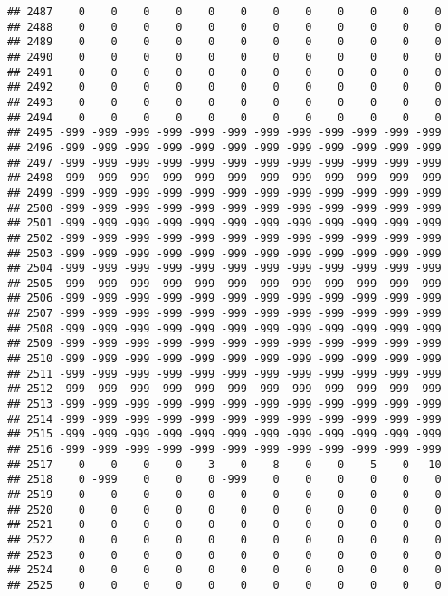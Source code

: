 \documentclass[]{article}
\begin{document}
\begin{verbatim}
## 2487    0    0    0    0    0    0    0    0    0    0    0    0
## 2488    0    0    0    0    0    0    0    0    0    0    0    0
## 2489    0    0    0    0    0    0    0    0    0    0    0    0
## 2490    0    0    0    0    0    0    0    0    0    0    0    0
## 2491    0    0    0    0    0    0    0    0    0    0    0    0
## 2492    0    0    0    0    0    0    0    0    0    0    0    0
## 2493    0    0    0    0    0    0    0    0    0    0    0    0
## 2494    0    0    0    0    0    0    0    0    0    0    0    0
## 2495 -999 -999 -999 -999 -999 -999 -999 -999 -999 -999 -999 -999
## 2496 -999 -999 -999 -999 -999 -999 -999 -999 -999 -999 -999 -999
## 2497 -999 -999 -999 -999 -999 -999 -999 -999 -999 -999 -999 -999
## 2498 -999 -999 -999 -999 -999 -999 -999 -999 -999 -999 -999 -999
## 2499 -999 -999 -999 -999 -999 -999 -999 -999 -999 -999 -999 -999
## 2500 -999 -999 -999 -999 -999 -999 -999 -999 -999 -999 -999 -999
## 2501 -999 -999 -999 -999 -999 -999 -999 -999 -999 -999 -999 -999
## 2502 -999 -999 -999 -999 -999 -999 -999 -999 -999 -999 -999 -999
## 2503 -999 -999 -999 -999 -999 -999 -999 -999 -999 -999 -999 -999
## 2504 -999 -999 -999 -999 -999 -999 -999 -999 -999 -999 -999 -999
## 2505 -999 -999 -999 -999 -999 -999 -999 -999 -999 -999 -999 -999
## 2506 -999 -999 -999 -999 -999 -999 -999 -999 -999 -999 -999 -999
## 2507 -999 -999 -999 -999 -999 -999 -999 -999 -999 -999 -999 -999
## 2508 -999 -999 -999 -999 -999 -999 -999 -999 -999 -999 -999 -999
## 2509 -999 -999 -999 -999 -999 -999 -999 -999 -999 -999 -999 -999
## 2510 -999 -999 -999 -999 -999 -999 -999 -999 -999 -999 -999 -999
## 2511 -999 -999 -999 -999 -999 -999 -999 -999 -999 -999 -999 -999
## 2512 -999 -999 -999 -999 -999 -999 -999 -999 -999 -999 -999 -999
## 2513 -999 -999 -999 -999 -999 -999 -999 -999 -999 -999 -999 -999
## 2514 -999 -999 -999 -999 -999 -999 -999 -999 -999 -999 -999 -999
## 2515 -999 -999 -999 -999 -999 -999 -999 -999 -999 -999 -999 -999
## 2516 -999 -999 -999 -999 -999 -999 -999 -999 -999 -999 -999 -999
## 2517    0    0    0    0    3    0    8    0    0    5    0   10
## 2518    0 -999    0    0    0 -999    0    0    0    0    0    0
## 2519    0    0    0    0    0    0    0    0    0    0    0    0
## 2520    0    0    0    0    0    0    0    0    0    0    0    0
## 2521    0    0    0    0    0    0    0    0    0    0    0    0
## 2522    0    0    0    0    0    0    0    0    0    0    0    0
## 2523    0    0    0    0    0    0    0    0    0    0    0    0
## 2524    0    0    0    0    0    0    0    0    0    0    0    0
## 2525    0    0    0    0    0    0    0    0    0    0    0    0

\end{verbatim}
\end{document}
